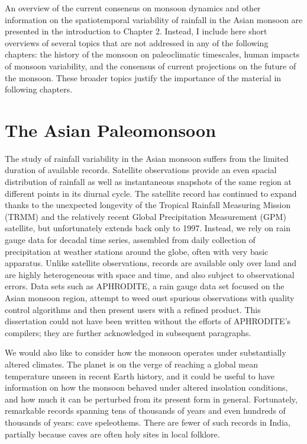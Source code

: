 	An overview of the current consensus on monsoon dynamics and other information on the spatiotemporal variability of rainfall in the Asian monsoon are presented in the introduction to Chapter 2. Instead, I include here short overviews of several topics that are not addressed in any of the following chapters: the history of the monsoon on paleoclimatic timescales, human impacts of monsoon variability, and the consensus of current projections on the future of the monsoon. These broader topics justify the importance of the material in following chapters.
	
\section{The Asian Paleomonsoon}

	The study of rainfall variability in the Asian monsoon suffers from the limited duration of available records. Satellite observations provide an even spacial distribution of rainfall as well as instantaneous snapshots of the same region at different points in its diurnal cycle. The satellite record has continued to expand thanks to the unexpected longevity of the Tropical Rainfall Measuring Mission (TRMM) and the relatively recent Global Precipitation Measurement (GPM) satellite, but unfortunately extends back only to 1997. Instead, we rely on rain gauge data for decadal time series, assembled from daily collection of precipitation at weather stations around the globe, often with very basic apparatus. Unlike satellite observations, records are available only over land and are highly heterogeneous with space and time, and also subject to observational errors. Data sets such as APHRODITE, a rain gauge data set focused on the Asian monsoon region, attempt to weed oust spurious observations with quality control algorithms and then present users with a refined product. This dissertation could not have been written without the efforts of APHRODITE's compilers; they are further acknowledged in subsequent paragraphs.
	
	We would also like to consider how the monsoon operates under substantially altered climates. The planet is on the verge of reaching a global mean temperature unseen in recent Earth history, and it could be useful to have information on how the monsoon behaved under altered insolation conditions, and how much it can be perturbed from its present form in general. Fortunately, remarkable records spanning tens of thousands of years and even hundreds of thousands of years: cave speleothems. There are fewer of such records in India, partially because caves are often holy sites in local folklore.
	
